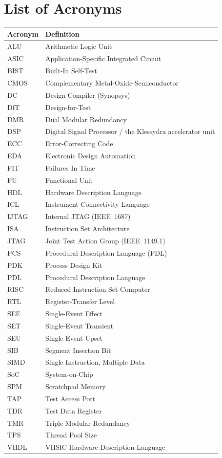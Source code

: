 \chapter*{List of Acronyms}

\begin{longtable}{p{2.6cm} p{11cm}}
\toprule
\textbf{Acronym} & \textbf{Definition} \\
\midrule
\endhead
ALU      & Arithmetic Logic Unit \\
ASIC     & Application-Specific Integrated Circuit \\
BIST     & Built-In Self-Test \\
CMOS     & Complementary Metal-Oxide-Semiconductor \\
DC       & Design Compiler (Synopsys) \\
DfT      & Design-for-Test \\
DMR      & Dual Modular Redundancy \\
DSP      & Digital Signal Processor / the Klessydra accelerator unit \\
ECC      & Error-Correcting Code \\
EDA      & Electronic Design Automation \\
FIT      & Failures In Time \\
FU       & Functional Unit \\
HDL      & Hardware Description Language \\
ICL      & Instrument Connectivity Language \\
IJTAG    & Internal JTAG (IEEE~1687) \\
ISA      & Instruction Set Architecture \\
JTAG     & Joint Test Action Group (IEEE~1149.1) \\
PCS      & Procedural Description Language (PDL) \\
PDK      & Process Design Kit \\
PDL      & Procedural Description Language \\
RISC     & Reduced Instruction Set Computer \\
RTL      & Register-Transfer Level \\
SEE      & Single-Event Effect \\
SET      & Single-Event Transient \\
SEU      & Single-Event Upset \\
SIB      & Segment Insertion Bit \\
SIMD     & Single Instruction, Multiple Data \\
SoC      & System-on-Chip \\
SPM      & Scratchpad Memory \\
TAP      & Test Access Port \\
TDR      & Test Data Register \\
TMR      & Triple Modular Redundancy \\
TPS      & Thread Pool Size \\
VHDL     & VHSIC Hardware Description Language \\
\bottomrule
\end{longtable}
